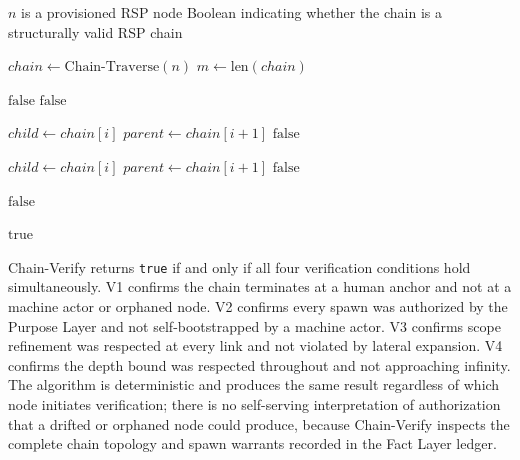 \begin{algorithm}
\caption{Chain-Verify($n$) --- Verify the structural validity of the authorization chain from node $n$}
\label{alg:chain-verify}
\begin{algorithmic}[1]
\REQUIRE $n$ is a provisioned RSP node
\ENSURE Boolean indicating whether the chain is a structurally valid RSP chain

\STATE $chain \leftarrow \text{Chain-Traverse}(n)$
\STATE $m \leftarrow \text{len}(chain)$

\STATE {}
    \STATE \RETURN $\text{false}$ 
\ENDIF
{}
    \STATE \RETURN $\text{false}$ 
\ENDIF

\STATE {}
    \STATE $child \leftarrow chain[i]$
    \STATE $parent \leftarrow chain[i+1]$
        \STATE \RETURN $\text{false}$ 
    \ENDIF
\ENDFOR

\STATE {}
    \STATE $child \leftarrow chain[i]$
    \STATE $parent \leftarrow chain[i+1]$
        \STATE \RETURN $\text{false}$ 
    \ENDIF
\ENDFOR

\STATE {}
        \STATE \RETURN $\text{false}$ 
    \ENDIF
\ENDFOR

\RETURN $\text{true}$
\end{algorithmic}
\end{algorithm}

Chain-Verify returns \texttt{true} if and only if all four verification conditions hold simultaneously. V1 confirms the chain terminates at a human anchor and not at a machine actor or orphaned node. V2 confirms every spawn was authorized by the Purpose Layer and not self-bootstrapped by a machine actor. V3 confirms scope refinement was respected at every link and not violated by lateral expansion. V4 confirms the depth bound was respected throughout and not approaching infinity. The algorithm is deterministic and produces the same result regardless of which node initiates verification; there is no self-serving interpretation of authorization that a drifted or orphaned node could produce, because Chain-Verify inspects the complete chain topology and spawn warrants recorded in the Fact Layer ledger.

